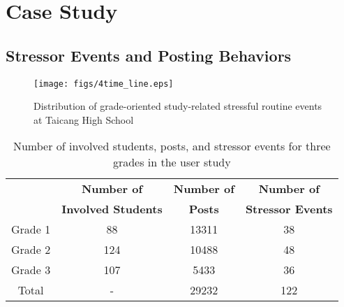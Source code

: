 \section{{Case Study}\label{sec:introduction}}

\subsection{Stressor Events and Posting Behaviors}
\begin{figure}
\centering
\texttt{[image: figs/4time\_line.eps]}
\caption{Distribution of grade-oriented study-related stressful routine events at Taicang High School}
\label{fig:eventDistribution}
\end{figure}

\setlength{\tabcolsep}{2.5pt}
\begin{table}
\begin{footnotesize}
\begin{center}
\begin{tabular}{|c|c|c|c|} \hline
& \textbf{Number of} & \textbf{Number of} & \textbf{Number of} \\
& \textbf{Involved Students} & \textbf{Posts} & \textbf{Stressor Events} \\ \hline
Grade 1 & 88 & 13311 & 38 \\\hline
Grade 2 & 124 & 10488 & 48\\\hline
Grade 3 & 107 &  5433 & 36 \\\hline
Total       &  -  & 29232 & 122 \\ \hline
\end{tabular}
\caption{Number of involved students, posts, and stressor events for three grades in the user study}
\label{tab:periodSummary}
\end{center}
\end{footnotesize}
\end{table}

